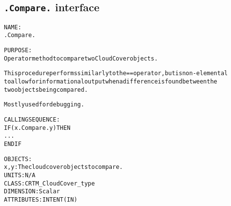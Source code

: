 \subsection{\texttt{.Compare.} interface}
  \label{sec:.Compare._interface}
  \begin{alltt}
 
  NAME:
    .Compare.
 
  PURPOSE:
    Operator method to compare two CloudCover objects.
 
    This procedure performs similarly to the == operator, but is non-elemental
    to allow for informational output when a difference is found between the
    two objects being compared.
 
    Mostly used for debugging.
 
  CALLING SEQUENCE:
    IF ( x .Compare. y ) THEN
      ...
    END IF
 
  OBJECTS:
    x, y:      The cloud cover objects to compare.
               UNITS:      N/A
               CLASS:      CRTM_CloudCover_type
               DIMENSION:  Scalar
               ATTRIBUTES: INTENT(IN)
 
  \end{alltt}
